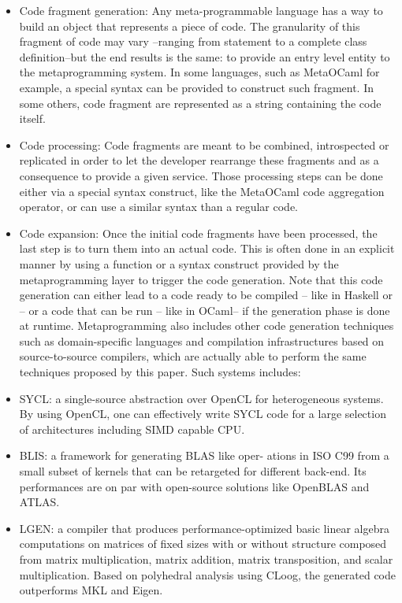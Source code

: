 \documentclass[../main]{subfiles}
\begin{document}
\begin{itemize}
\item Code fragment generation:
Any meta-programmable
language has a way to build an object that represents a
piece of code. The granularity of this fragment of code
may vary –ranging from statement to a complete class
definition–but the end results is the same: to provide
an entry level entity to the metaprogramming system.
In some languages, such as MetaOCaml for example,
a special syntax can be provided to construct such
fragment. In some others, code fragment are represented
as a string containing the code itself.

\item Code processing:
Code fragments are meant to
be combined, introspected or replicated in order to
let the developer rearrange these fragments and as a
consequence to provide a given service. Those processing
steps can be done either via a special syntax construct,
like the MetaOCaml code aggregation operator, or can
use a similar syntax than a regular code.

\item Code expansion:
Once the initial code fragments have
been processed, the last step is to turn them into an
actual code. This is often done in an explicit manner by
using a function or a syntax construct provided by the
metaprogramming layer to trigger the code generation.
Note that this code generation can either lead to a code
ready to be compiled – like in Haskell or \cpp– or a
code that can be run – like in OCaml– if the generation
phase is done at runtime.
Metaprogramming also includes other code generation
techniques such as domain-specific languages and compilation
infrastructures based on source-to-source compilers, which
are actually able to perform the same techniques proposed by
this paper. Such systems includes:

\item SYCL\cite{hpcs13}:
a single-source abstraction over OpenCL
for heterogeneous systems. By using OpenCL, one can
effectively write SYCL code for a large selection of
architectures including SIMD capable CPU.

\item BLIS\cite{hpcs14}:
a framework for generating BLAS like oper-
ations in ISO C99 from a small subset of kernels that can
be retargeted for different back-end. Its performances are
on par with open-source solutions like OpenBLAS and
ATLAS.

\item LGEN\cite{hpcs15}:
a compiler that produces performance-optimized
basic linear algebra computations on matrices
of fixed sizes with or without structure composed
from matrix multiplication, matrix addition, matrix
transposition, and scalar multiplication. Based on
polyhedral analysis using CLoog, the generated code
outperforms MKL and Eigen.
\end{itemize}
\end{document}

